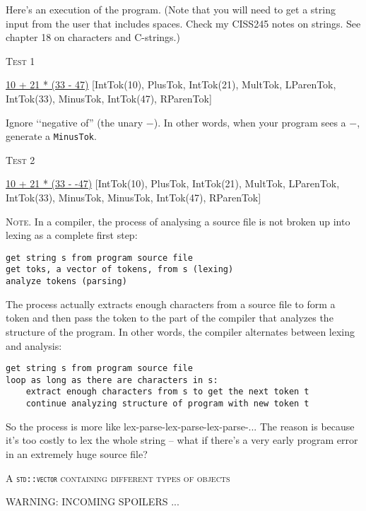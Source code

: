 Here's an execution of the program.
(Note that you will need to get a string input from the user
that includes spaces.
Check my CISS245 notes on strings.
See chapter 18 on characters and C-strings.)

\textsc{Test 1}
\begin{console}[commandchars=\\\{\},frame=single,fontsize=\scriptsize]
\underline{10 + 21 * (33 - 47)}
[IntTok(10), PlusTok, IntTok(21), MultTok, LParenTok, IntTok(33), MinusTok, IntTok(47), RParenTok]
\end{console}

Ignore \lq\lq negative of'' (the unary $-$).
In other words, when your program sees a $-$, generate a \verb!MinusTok!.

\textsc{Test 2}
{\scriptsize
\begin{console}[commandchars=\\\{\},frame=single,fontsize=\scriptsize]
\underline{10 + 21 * (33 - -47)}
[IntTok(10), PlusTok, IntTok(21), MultTok, LParenTok, IntTok(33), MinusTok, MinusTok, IntTok(47), RParenTok]
\end{console}
}

\textsc{Note.} In a compiler, the process of analysing a source file
is not broken up into lexing as a complete first step:
\begin{Verbatim}[frame=single,fontsize=\footnotesize]
get string s from program source file
get toks, a vector of tokens, from s (lexing)
analyze tokens (parsing)
\end{Verbatim}
The process actually extracts enough characters from a source file
to form a token and then pass the token to the part of the compiler that
analyzes the structure of the program. In other words, the compiler
alternates between lexing and analysis:
\begin{Verbatim}[fontsize=\footnotesize,frame=single]
get string s from program source file
loop as long as there are characters in s:
    extract enough characters from s to get the next token t
    continue analyzing structure of program with new token t 
\end{Verbatim}
So the process is more like lex-parse-lex-parse-lex-parse-...
The reason is because it's too costly to lex the whole string -- what if
there's a very early program error in an extremely huge source file?

\newpage
\textsc{A \textnormal{\texttt{std::vector}} containing different types of objects}

WARNING: INCOMING SPOILERS ...

